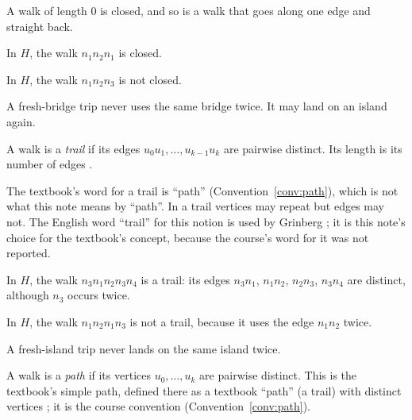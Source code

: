 \begin{remark}
A walk of length 0 is closed, and so is a walk that goes along one edge
and straight back.
\end{remark}
\begin{example}
In $H$, the walk $n_1n_2n_1$ is closed.
\end{example}
\begin{nonexample}
In $H$, the walk $n_1n_2n_3$ is not closed.
\end{nonexample}

\plainwords{} A fresh-bridge trip never uses the same bridge twice. It may
land on an island again.

\begin{definition}\label{def:trail}
A walk is a \emph{trail} if its edges $u_0u_1,\dots,u_{k-1}u_k$ are
pairwise distinct. Its length is its number of edges
\cite[Definition~1.2.12, p.~22]{petrosyan2015graphs}.
\end{definition}

\begin{remark}
The textbook's word for a trail is ``path'' (Convention~\ref{conv:path}),
which is not what this note means by ``path''. In a trail vertices may
repeat but edges may not. The English word ``trail'' for this notion is
used by Grinberg \cite[Definition~3.4.5, p.~101]{grinberg2025graph}; it is
this note's choice for the textbook's concept, because the course's word
for it was not reported.
\end{remark}
\begin{example}
In $H$, the walk $n_3n_1n_2n_3n_4$ is a trail: its edges $n_3n_1$,
$n_1n_2$, $n_2n_3$, $n_3n_4$ are distinct, although $n_3$ occurs twice.
\end{example}
\begin{nonexample}
In $H$, the walk $n_1n_2n_1n_3$ is not a trail, because it uses the edge
$n_1n_2$ twice.
\end{nonexample}

\plainwords{} A fresh-island trip never lands on the same island twice.

\begin{definition}\label{def:path}
A walk is a \emph{path} if its vertices $u_0,\dots,u_k$ are pairwise
distinct. This is the textbook's simple path, defined there as a
textbook ``path'' (a trail) with distinct vertices
\cite[Definition~1.2.13, p.~22]{petrosyan2015graphs}; it is the course
convention (Convention~\ref{conv:path}).
\end{definition}

